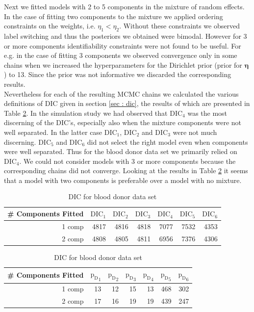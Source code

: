 Next we fitted models with 2 to 5 components in the mixture of random effects. In the case of fitting two components to the mixture we applied ordering constraints on the weights, i.e. $\eta_1 < \eta_2$. Without these constraints we observed label switching and thus the posteriors we obtained were bimodal. However for 3 or more components identifiability constraints were not found to be useful. For e.g. in the case of fitting 3 components we observed convergence only in some chains when we increased the hyperparameters for the Dirichlet prior (prior for $\boldsymbol{\eta}$) to 13. Since the prior was not informative we discarded the corresponding results.\\

Nevertheless for each of the resulting MCMC chains we calculated the various definitions of DIC given in section \ref{sec : dic}, the results of which are presented in Table \ref{table : dic_blood_donor}. In the simulation study we had observed that $\text{DIC}_4$ was the most discerning of the DIC's, especially also when the mixture components were not well separated. In the latter case $\text{DIC}_1$, $\text{DIC}_2$ and $\text{DIC}_3$ were not much discerning. $\text{DIC}_5$ and $\text{DIC}_6$ did not select the right model even when components were well separated. Thus for the blood donor data set we primarily relied on $\text{DIC}_4$. We could not consider models with 3 or more components because the corresponding chains did not converge. Looking at the results in Table \ref{table : dic_blood_donor} it seems that a model with two components is preferable over a model with no mixture.

\begin{table}[!htb]
\centering
\captionsetup{justification=centering}
\caption{DIC for blood donor data set}
\label{table : dic_blood_donor}
\begin{tabular}{@{}rrrrrrr@{}}
\toprule
\# Components Fitted & $\text{DIC}_1$ & $\text{DIC}_2$ & $\text{DIC}_3$  & $\text{DIC}_4$  & $\text{DIC}_5$  & $\text{DIC}_6$  \\ \midrule
1 comp & 4817 & 4816 & 4818 & 7077 & 7532 & 4353 \\
2 comp & 4808 & 4805 & 4811 & 6956 & 7376 & 4306 \\
\bottomrule
\end{tabular}
\begin{tabular}{@{}rrrrrrr@{}}
\toprule
\# Components Fitted & ${\text{p}_\text{D}}_1$ & ${\text{p}_\text{D}}_2$ & ${\text{p}_\text{D}}_3$ & ${\text{p}_\text{D}}_4$ & ${\text{p}_\text{D}}_5$ & ${\text{p}_\text{D}}_6$ \\ \midrule
1 comp & 13 & 12 & 15 & 13 & 468 & 302 \\
2 comp & 17 & 16 & 19 & 19 & 439 & 247 \\
\bottomrule
\end{tabular}
\end{table}

